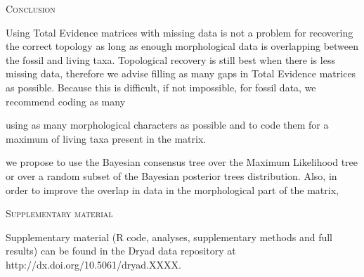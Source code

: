 \documentclass[12pt,letterpaper]{article}
\renewcommand{\section}[1]{%
\bigskip
\begin{center}
\begin{Large}
\normalfont\scshape #1
\medskip
\end{Large}
\end{center}}
\begin{document}
%
%

\section{Conclusion}

Using Total Evidence matrices with missing data is not a problem for recovering the correct topology as long as enough morphological data is overlapping between the fossil and living taxa. %
Topological recovery is still best when there is less missing data, therefore we advise filling as many gaps in Total Evidence matrices as possible. Because this is difficult, if not impossible, for fossil data, we recommend coding as many


using as many morphological characters as possible and to code them for a maximum of living taxa present in the matrix.


we propose to use the Bayesian consensus tree over the Maximum Likelihood tree or over a random subset of the Bayesian posterior trees distribution. Also, in order to improve the overlap in data in the morphological part of the matrix, 


%
%
\section{Supplementary material}
Supplementary material (R code, analyses, supplementary methods and full results) can be found in the Dryad data repository at http://dx.doi.org/10.5061/dryad.XXXX. %
\end{document}
